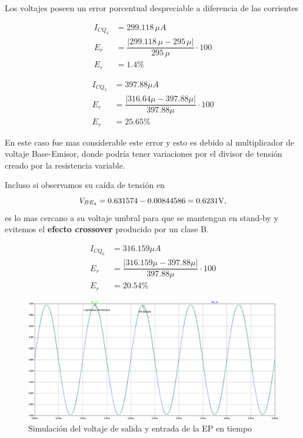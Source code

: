 \begin{enumerate}
        Los voltajes poseen un error porcentual despreciable a diferencia de las corrientes


        \begin{align*}
          I_{CQ_4} & =299.118 \, \mu A                                       \\[0.2cm]
          E_r      & =\dfrac{|299.118 \,\mu-295 \,\mu|}{295 \, \mu}\cdot 100 \\[0.2cm]
          E_r      & =1.4\%
        \end{align*}

        \begin{align*}
          I_{CQ_5} & =397.88 \mu A                                      \\[0.2cm]
          E_r      & =\dfrac{|316.64\mu-397.88\mu|}{397.88\mu}\cdot 100 \\[0.2cm]
          E_r      & =25.65\%
        \end{align*}

        En este caso fue mas considerable este error y esto es debido al multiplicador de voltaje Base-Emisor, donde podría tener variaciones por el divisor de tensión creado por la resistencia variable.

        Incluso si observamos su caída de tensión en $$V_{BE_4}= 0.631574-0.00844586= 0.6231\volt,$$
        es lo mas cercano a su voltaje umbral para que se mantengan en stand-by y evitemos el \textbf{efecto crossover} producido por un clase B.

        \begin{align*}
          I_{CQ_6} & =316.159 \mu A                                      \\[0.2cm]
          E_r      & =\dfrac{|316.159\mu-397.88\mu|}{397.88\mu}\cdot 100 \\[0.2cm]
          E_r      & =20.54\%
        \end{align*}

        \begin{figure}[H]
          \centering
          \includegraphics[width=\textwidth]{Imagenes/sim_voep.png}
          \caption{Simulación del voltaje de salida y entrada de la EP en tiempo}
          \label{fig:voep}
        \end{figure}


\end{enumerate}
